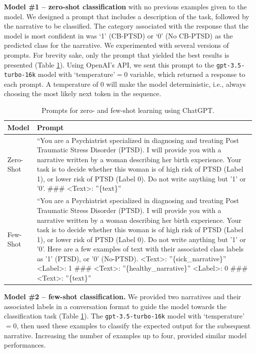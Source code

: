 \documentclass[bst/sn-nature]{sn-jnl}%
\theoremstyle{thmstyleone}%
\theoremstyle{thmstyletwo}%
\theoremstyle{thmstylethree}%
\begin{document}
\textbf{Model \#1 -- zero-shot classification} with no previous examples given to the model. 
We designed a prompt that includes a description of the task, followed by the narrative to be classified.
The category associated with the response that the model is most confident in was `1' (CB-PTSD) or `0' (No CB-PTSD) as the predicted class for the narrative.
We experimented with several versions of prompts.
For brevity sake, only the prompt that yielded the best results is presented (Table \ref{tbl:prompts}).
Using OpenAI's API, we sent this prompt to the \texttt{gpt-3.5-turbo-16k} model with `temperature'$=0$ variable, which returned a response to each prompt.
A temperature of 0 will make the model deterministic, i.e., always choosing the most likely next token in the sequence.


\begin{table}
\centering
\caption{Prompts for zero- and few-shot learning using ChatGPT.}
\label{tbl:prompts}
\begin{tabularx}{\textwidth}{lX}
\hline
Model     & Prompt   \\ 
\hline
Zero-Shot & 
``You are a Psychiatrist specialized in diagnosing and treating Post Traumatic Stress Disorder (PTSD). I will provide you with a narrative written by a woman describing her birth experience. Your task is to decide whether this woman is of high risk of PTSD (Label 1), or lower risk of PTSD (Label 0). Do not write anything but '1' or '0'.
\#\#\# 
\textless{}Text\textgreater{}: ''\{text\}''
\\
\hline
Few-Shot  & 
``You are a Psychiatrist specialized in diagnosing and treating Post Traumatic Stress Disorder (PTSD). I will provide you with a narrative written by a woman describing her birth experience. Your task is to decide whether this woman is of high risk of PTSD (Label 1), or lower risk of PTSD (Label 0). Do not write anything but '1' or '0'. Here are a few examples of text with their associated class labels as '1' (PTSD), or '0' (No-PTSD). 
\textless{}Text\textgreater{}: ''\{sick\_narrative\}'' 
\textless{}Label\textgreater{}: 1
\#\#\# 
\textless{}Text\textgreater{}: ''\{healthy\_narrative\}''
\textless{}Label\textgreater{}: 0 
\#\#\#
\textless{}Text\textgreater{}: ''\{text\}''
\\
\hline
\end{tabularx}
\end{table}


\textbf{Model \#2 -- few-shot classification.}
We provided two narratives and their associated labels in a conversation format to guide the model towards the classification task (Table \ref{tbl:prompts}). 
The \texttt{gpt-3.5-turbo-16k} model with `temperature'$=0$, then used these examples to classify the expected output for the subsequent narrative. 
Increasing the number of examples up to four, provided similar model performances.
\end{document}
